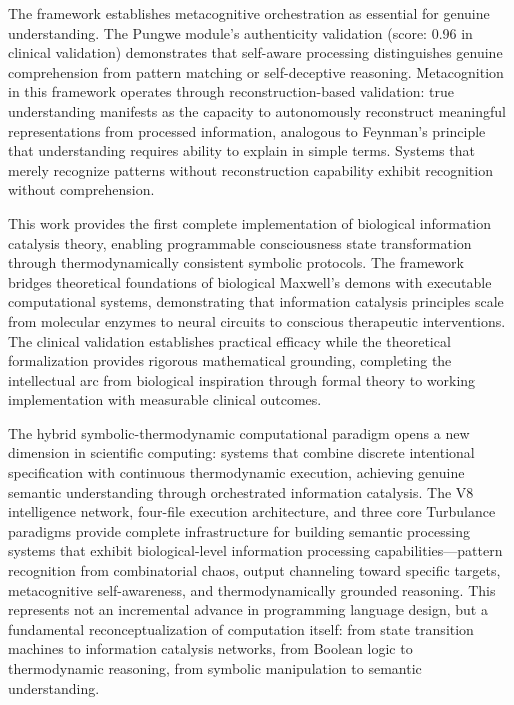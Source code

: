 \documentclass[12pt,a4paper]{article}
\theoremstyle{definition}
\theoremstyle{remark}
\begin{document}
The framework establishes metacognitive orchestration as essential for genuine understanding. The Pungwe module's authenticity validation (score: 0.96 in clinical validation) demonstrates that self-aware processing distinguishes genuine comprehension from pattern matching or self-deceptive reasoning. Metacognition in this framework operates through reconstruction-based validation: true understanding manifests as the capacity to autonomously reconstruct meaningful representations from processed information, analogous to Feynman's principle that understanding requires ability to explain in simple terms. Systems that merely recognize patterns without reconstruction capability exhibit recognition without comprehension.

This work provides the first complete implementation of biological information catalysis theory, enabling programmable consciousness state transformation through thermodynamically consistent symbolic protocols. The framework bridges theoretical foundations of biological Maxwell's demons with executable computational systems, demonstrating that information catalysis principles scale from molecular enzymes to neural circuits to conscious therapeutic interventions. The clinical validation establishes practical efficacy while the theoretical formalization provides rigorous mathematical grounding, completing the intellectual arc from biological inspiration through formal theory to working implementation with measurable clinical outcomes.

The hybrid symbolic-thermodynamic computational paradigm opens a new dimension in scientific computing: systems that combine discrete intentional specification with continuous thermodynamic execution, achieving genuine semantic understanding through orchestrated information catalysis. The V8 intelligence network, four-file execution architecture, and three core Turbulance paradigms provide complete infrastructure for building semantic processing systems that exhibit biological-level information processing capabilities—pattern recognition from combinatorial chaos, output channeling toward specific targets, metacognitive self-awareness, and thermodynamically grounded reasoning. This represents not an incremental advance in programming language design, but a fundamental reconceptualization of computation itself: from state transition machines to information catalysis networks, from Boolean logic to thermodynamic reasoning, from symbolic manipulation to semantic understanding.




\end{document}
